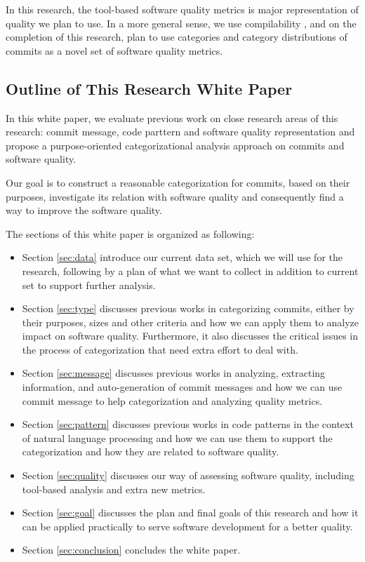 In this research, the tool-based software quality metrics is major representation of quality we plan to use.
In a more general sense, we use compilability , and on the completion of this research, plan to use categories and category distributions of commits as a novel set of software quality metrics.


\subsection{Outline of This Research White Paper}
In this white paper, we evaluate previous work on close research areas of this research: commit message, code parttern and software quality representation and propose a purpose-oriented categorizational analysis approach on commits and software quality.

Our goal is to construct a reasonable categorization for commits, based on their purposes, investigate its relation with software quality and consequently find a way to improve the software quality.

The sections of this white paper is organized as following:
\begin{itemize}
    \item Section \ref{sec:data} introduce our current data set, which we will use for the research, following by a plan of what we want to collect in addition to current set to support further analysis.
    \item Section \ref{sec:type} discusses previous works in categorizing commits, either by their purposes, sizes and other criteria and how we can apply them to analyze impact on software quality. Furthermore, it also discusses the critical issues in the process of categorization that need extra effort to deal with.
    \item Section \ref{sec:message} discusses previous works in analyzing, extracting information, and auto-generation of commit messages  and how we can use commit message to help categorization and analyzing quality metrics.
    \item Section \ref{sec:pattern} discusses previous works in code patterns in the context of natural language processing and how we can use them to support the categorization and how they are related to software quality.
    \item Section \ref{sec:quality} discusses our way of assessing software quality, including tool-based analysis and extra new metrics.
    \item Section \ref{sec:goal} discusses the plan and final goals of this research and how it can be applied practically to serve software development for a better quality.
    \item Section \ref{sec:conclusion} concludes the white paper.
\end{itemize}


